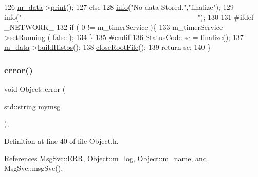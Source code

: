 \begin{DoxyCode}
126     \hyperlink{classProcessus_a3da9a9de8af54e2f47807a3e09dfccff}{m\_data}->\hyperlink{classData_a779ce878d01483220b49ad9e513d7366}{print}();
127   \textcolor{keywordflow}{else} 
128     \hyperlink{classObject_a644fd329ea4cb85f54fa6846484b84a8}{info}(\textcolor{stringliteral}{"No data Stored."},\textcolor{stringliteral}{"finalize"});
129   \hyperlink{classObject_a644fd329ea4cb85f54fa6846484b84a8}{info}(\textcolor{stringliteral}{"--------------------------------------------------------------------------"});
130 
131 \textcolor{preprocessor}{#ifdef \_NETWORK\_}
132   \textcolor{keywordflow}{if} ( 0 != m\_timerService )\{
133     m\_timerService->setRunning ( \textcolor{keyword}{false} );
134   \}
135 \textcolor{preprocessor}{#endif}
136   \hyperlink{classStatusCode}{StatusCode} sc = \hyperlink{classProcessus_aba93d691f031bdb18ae4b8afb1b2e856}{finalize}();
137   \hyperlink{classProcessus_a3da9a9de8af54e2f47807a3e09dfccff}{m\_data}->\hyperlink{classData_a0c21ebc7662b7a6e25171959689481ca}{buildHistos}();  
138   \hyperlink{classProcessus_a2f3c41e99da4c738ea3d8f7b0d20a665}{closeRootFile}();
139   \textcolor{keywordflow}{return} sc;
140 \}
\end{DoxyCode}
\mbox{\label{classObject_a204a95f57818c0f811933917a30eff45}} 
\subsubsection{\texorpdfstring{error()}{error()}\hspace{0.1cm}{\footnotesize\ttfamily [1/2]}}
{\footnotesize\ttfamily void Object\+::error (\begin{DoxyParamCaption}\item[{std\+::string}]{mymsg }\end{DoxyParamCaption})\hspace{0.3cm}{\ttfamily [inline]}, {\ttfamily [inherited]}}



Definition at line 40 of file Object.\+h.



References Msg\+Svc\+::\+E\+RR, Object\+::m\+\_\+log, Object\+::m\+\_\+name, and Msg\+Svc\+::msg\+Svc().



